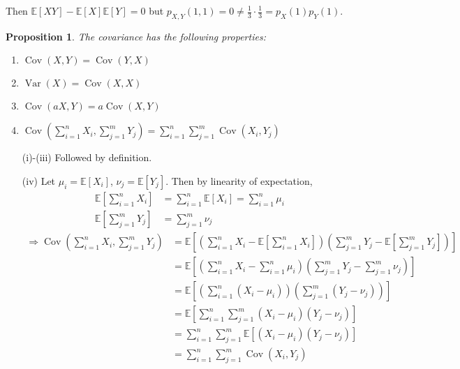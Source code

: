 \documentclass[a4paper,11pt]{amsbook}
\makeatletter
\renewenvironment{proof}[1][\proofname]{\par
    \pushQED{\qed}%
    \normalfont \topsep6\p@\@plus6\p@\relax
    \trivlist
    \itemindent\z@ %
    \item[\hskip\labelsep
          \scshape
      #1\@addpunct{.}]\ignorespaces
}{%
    \popQED\endtrivlist\@endpefalse
}
\newtheorem{proposition}{\hspace{-2em} \color{darkblue} Proposition}[chapter]
\theoremstyle{definition}
\theoremstyle{remark}
\newcommand{\E}{\mathbb{E}}
\DeclareMathOperator\Var{Var}
\DeclareMathOperator\Cov{Cov}
\newcommand\0{\varnothing}
\makeatother
\begin{document}
    Then $\E[XY]-\E[X]\E[Y]=0$ but $p_{X,Y}(1,1)=0\neq\frac13\cdot\frac13=p_X(1)p_Y(1)$.

\begin{proposition} 
    The covariance has the following properties: \begin{enumerate}[label=(\roman*)]
        \item $\Cov(X,Y)=\Cov(Y,X)$
        \item $\Var(X)=\Cov(X,X)$
        \item $\Cov(aX,Y)=a\Cov(X,Y)$
        \item $\Cov\left(\sum_{i=1}^nX_i,\sum_{j=1}^{m}Y_j\right)=\sum_{i=1}^n\sum_{j=1}^{m}\Cov(X_i,Y_j)$
    \end{enumerate}
\end{proposition}
\begin{proof}
    \begin{enumerate}
        \item[(i)-(iii)] Followed by definition.
        \item[(iv)] Let $\mu_i=\E[X_i]$, $\nu_j=\E[Y_j]$. Then by linearity of expectation,
        \begin{align*}
            \E\left[\sum_{i=1}^nX_i\right]&=\sum_{i=1}^n\E[X_i]=\sum_{i=1}^n\mu_i \\
            \E\left[\sum_{j=1}^mY_j\right]&=\sum_{j=1}^m\nu_j
        \end{align*}
        \begin{align*}
            \Rightarrow \Cov\left(\sum_{i=1}^nX_i,\sum_{j=1}^mY_j\right)&=\E\left[\left(\sum_{i=1}^nX_i-\E\left[\sum_{i=1}^nX_i\right]\right)\left(\sum_{j=1}^mY_j-\E\left[\sum_{j=1}^mY_j\right]\right)\right] \\
            &=\E\left[\left(\sum_{i=1}^nX_i-\sum_{i=1}^n\mu_i\right)\left(\sum_{j=1}^mY_j-\sum_{j=1}^m\nu_j\right)\right] \\
            &=\E\left[\left(\sum_{i=1}^n(X_i-\mu_i)\right)\left(\sum_{j=1}^m(Y_j-\nu_j)\right)\right] \\
            &=\E\left[\sum_{i=1}^n\sum_{j=1}^m(X_i-\mu_i)(Y_j-\nu_j)\right] \\
            &=\sum_{i=1}^n\sum_{j=1}^m\E\left[(X_i-\mu_i)(Y_j-\nu_j)\right] \tag{LoE} \\
            &=\sum_{i=1}^n\sum_{j=1}^m\Cov(X_i,Y_j)
        \end{align*}
    \end{enumerate}
\end{proof}
\end{document}
